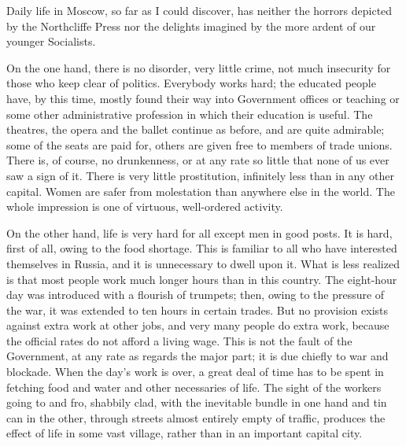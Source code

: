 Daily life in Moscow, so far as I could discover, has neither the horrors depicted by the Northcliffe Press nor the delights imagined by the more ardent of our younger Socialists.

On the one hand, there is no disorder, very little crime, not much insecurity for those who keep clear of politics. Everybody works hard; the educated people have, by this time, mostly found their way into Government offices or teaching or some other administrative profession in which their education is useful. The theatres, the opera and the ballet continue as before, and are quite admirable; some of the seats are paid for, others are given free to members of trade unions. There is, of course, no drunkenness, or at any rate so little that none of us ever saw a sign of it. There is very little prostitution, infinitely less than in any other capital. Women are safer from molestation than anywhere else in the world. The whole impression is one of virtuous, well-ordered activity.

On the other hand, life is very hard for all except men in good posts. It is hard, first of all, owing to the food shortage. This is familiar to all who have interested themselves in Russia, and it is unnecessary to dwell upon it. What is less realized is that most people work much longer hours than in this country. The eight-hour day was introduced with a flourish of trumpets; then, owing to the pressure of the war, it was extended to ten hours in certain trades. But no provision exists against extra work at other jobs, and very many people do extra work, because the official rates do not afford a living wage. This is not the fault of the Government, at any rate as regards the major part; it is due chiefly to war and blockade. When the day's work is over, a great deal of time has to be spent in fetching food and water and other necessaries of life. The sight of the workers going to and fro, shabbily clad, with the inevitable bundle in one hand and tin can in the other, through streets almost entirely empty of traffic, produces the effect of life in some vast village, rather than in an important capital city.

